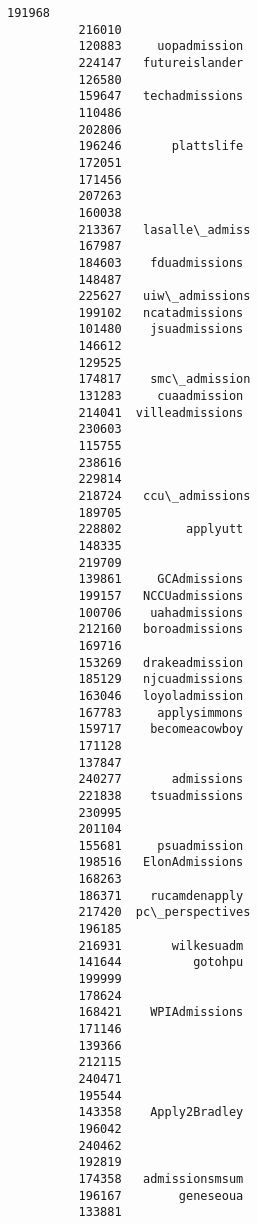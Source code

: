 \documentclass[11pt]{article}
\begin{document}
\begin{Verbatim}[commandchars=\\\{\}]
          191968                   
          216010                   
          120883     uopadmission  
          224147   futureislander  
          126580                   
          159647   techadmissions  
          110486                   
          202806                   
          196246       plattslife  
          172051                   
          171456                   
          207263                   
          160038                   
          213367   lasalle\_admiss  
          167987                   
          184603    fduadmissions  
          148487                   
          225627   uiw\_admissions  
          199102   ncatadmissions  
          101480    jsuadmissions  
          146612                   
          129525                   
          174817    smc\_admission  
          131283     cuaadmission  
          214041  villeadmissions  
          230603                   
          115755                   
          238616                   
          229814                   
          218724   ccu\_admissions  
          189705                   
          228802         applyutt  
          148335                   
          219709                   
          139861     GCAdmissions  
          199157   NCCUadmissions  
          100706    uahadmissions  
          212160   boroadmissions  
          169716                   
          153269   drakeadmission  
          185129   njcuadmissions  
          163046   loyoladmission  
          167783     applysimmons  
          159717    becomeacowboy  
          171128                   
          137847                   
          240277       admissions  
          221838    tsuadmissions  
          230995                   
          201104                   
          155681     psuadmission  
          198516   ElonAdmissions  
          168263                   
          186371    rucamdenapply  
          217420  pc\_perspectives  
          196185                   
          216931       wilkesuadm  
          141644          gotohpu  
          199999                   
          178624                   
          168421    WPIAdmissions  
          171146                   
          139366                   
          212115                   
          240471                   
          195544                   
          143358    Apply2Bradley  
          196042                   
          240462                   
          192819                   
          174358   admissionsmsum  
          196167        geneseoua  
          133881                   

\end{Verbatim}
\end{document}
